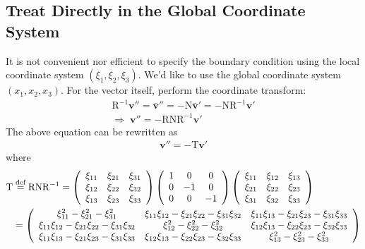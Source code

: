 \documentclass[a4paper,12pt,dvips]{article}
\newcommand*\defeq{\buildrel{\text{def}}\over{=}}
\begin{document}
\subsection{Treat Directly in the Global Coordinate System}

It is not convenient nor efficient to specify the boundary condition using the
local coordinate system $(\xi_1, \xi_2, \xi_3)$.  We'd like to use the global
coordinate system $(x_1, x_2, x_3)$.  For the vector itself, perform the
coordinate transform:
\begin{gather*}
  \mathrm{R}^{-1}\mathbf{v}''
  = \bar{\mathbf{v}}''
  = -\mathrm{N}\bar{\mathbf{v}}'
  = -\mathrm{N}\mathrm{R}^{-1}\mathbf{v}'
  \\
  \Rightarrow \;
  \mathbf{v}'' = -\mathrm{RNR^{-1}}\mathbf{v}'
\end{gather*}
The above equation can be rewritten as
\begin{align*}
  \mathbf{v}'' = -\mathrm{T}\mathbf{v}'
\end{align*}
where
\begin{align*}
  \mathrm{T}
 &\defeq \mathrm{RNR^{-1}}
  = \left(\begin{array}{ccc}
    \xi_{11} & \xi_{21} & \xi_{31} \\
    \xi_{12} & \xi_{22} & \xi_{32} \\
    \xi_{13} & \xi_{23} & \xi_{33}
  \end{array}\right)
  \left(\begin{array}{ccc}
    1 & 0 & 0 \\
    0 & -1 & 0 \\
    0 & 0 & -1
  \end{array}\right)
  \left(\begin{array}{ccc}
    \xi_{11} & \xi_{12} & \xi_{13} \\
    \xi_{21} & \xi_{22} & \xi_{23} \\
    \xi_{31} & \xi_{32} & \xi_{33}
  \end{array}\right)
  \\
 &= \left(\begin{array}{ccc}
    \xi_{11}^2       - \xi_{21}^2       - \xi_{31}^2       &
    \xi_{11}\xi_{12} - \xi_{21}\xi_{22} - \xi_{31}\xi_{32} &
    \xi_{11}\xi_{13} - \xi_{21}\xi_{23} - \xi_{31}\xi_{33} \\
    \xi_{11}\xi_{12} - \xi_{21}\xi_{22} - \xi_{31}\xi_{32} &
    \xi_{12}^2       - \xi_{22}^2       - \xi_{32}^2       &
    \xi_{12}\xi_{13} - \xi_{22}\xi_{23} - \xi_{32}\xi_{33} \\
    \xi_{11}\xi_{13} - \xi_{21}\xi_{23} - \xi_{31}\xi_{33} &
    \xi_{12}\xi_{13} - \xi_{22}\xi_{23} - \xi_{32}\xi_{33} &
    \xi_{13}^2       - \xi_{23}^2       - \xi_{33}^2
  \end{array}\right)
\end{align*}
\end{document}
